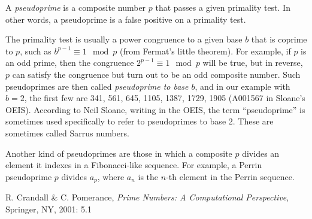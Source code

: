 \documentclass[12pt]{article}
\begin{document}
A {\em pseudoprime} is a composite number $p$ that passes a given primality test. In other words, a pseudoprime is a false positive on a primality test.

The primality test is usually a power congruence to a given base $b$ that is coprime to $p$, such as $b^{p - 1} \equiv 1 \mod p$ (from Fermat's little theorem). For example, if $p$ is an odd prime, then the congruence $2^{p - 1} \equiv 1 \mod p$ will be true, but in reverse, $p$ can satisfy the congruence but turn out to be an odd composite number. Such pseudoprimes are then called {\em pseudoprime to base $b$}, and in our example with $b = 2$, the first few are 341, 561, 645, 1105, 1387, 1729, 1905 (A001567 in Sloane's OEIS). According to Neil Sloane, writing in the OEIS, the term ``pseudoprime'' is sometimes used specifically to refer to pseudoprimes to base 2. These are sometimes called Sarrus numbers.

Another kind of pseudoprimes are those in which a composite $p$ divides an element it indexes in a Fibonacci-like sequence. For example, a Perrin pseudoprime $p$ divides $a_p$, where $a_n$ is the $n$-th element in the Perrin sequence.

\begin{thebibliography}{1}
 R. Crandall \& C. Pomerance, {\it Prime Numbers: A Computational Perspective}, Springer, NY, 2001: 5.1
\end{thebibliography}
\end{document}
